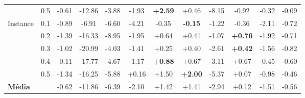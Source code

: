 \begin{table}[htbp]
{\begin{tabular}{llcccccccccc}
 & 0.5 & -0.61 & -12.86 & -3.88 & -1.93 & \textbf{+2.59} & +0.46 & -8.15 & -0.92 & -0.32 & -0.09 \\
Instance & 0.1 & -0.89 & -6.91 & -6.60 & -4.21 & -0.35 & \textbf{-0.15} & -1.22 & -0.36 & -2.11 & -0.72 \\
 & 0.2 & -1.39 & -16.33 & -8.95 & -1.95 & +0.64 & +0.41 & -1.07 & \textbf{+0.76} & -1.92 & -0.71 \\
 & 0.3 & -1.02 & -20.99 & -4.03 & -1.41 & +0.25 & +0.40 & -2.61 & \textbf{+0.42} & -1.56 & -0.82 \\
 & 0.4 & -0.11 & -17.77 & -4.67 & -1.17 & \textbf{+0.88} & +0.67 & -3.11 & +0.67 & -0.45 & -0.60 \\
 & 0.5 & -1.34 & -16.25 & -5.88 & +0.16 & +1.50 & \textbf{+2.00} & -5.37 & +0.07 & -0.98 & -0.46 \\
\midrule
\textbf{Média} &  & -0.62 & -11.86 & -6.39 & -2.10 & +1.42 & +1.41 & -2.94 & +0.12 & -1.51 & -0.56 \\
\bottomrule
\end{tabular}
}
\end{table}
